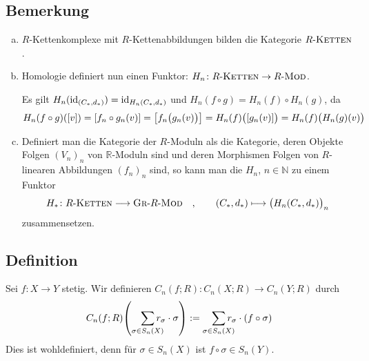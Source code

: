 \subsection[Bemerkung: Homologie definiert einen Funktor]{Bemerkung} %
\label{sub:63}
\begin{enumerate}[a)]
	\item $R$-Kettenkomplexe mit $R$-Kettenabbildungen bilden die Kategorie $R\text{-}\textsc{Ketten}$.
	\item Homologie definiert nun einen Funktor: $H_n \colon R\text{-}\textsc{Ketten} \to R\text{-}\MOD$.
	
	Es gilt $H_n(\id_{(C_*,d_*)}) = \id_{H_n(C_*,d_*)}$ und $H_n(f \circ g) = H_n(f) \circ H_n(g)$, da
	\[
		H_n(f \circ g) \enbrace*{[v]} = \benbrace*{f_n \circ g_n(v)} = \benbrace*{f_n \enbrace[\big]{g_n(v)} } = H_n(f) \enbrace[\big]{\benbrace*{g_n(v)}} = H_n(f) \enbrace[\big]{H_n(g)(v)}     
	\]
	\item Definiert man die Kategorie der  $R$-Moduln als die Kategorie, deren Objekte Folgen $(V_n)_n$ von $\mathds{R}$-Moduln sind und deren
	Morphismen Folgen von $R$-linearen Abbildungen $(f_n)_{n}$ sind, so kann man die $H_n$, $n \in \mathds{N}$ zu einem Funktor
	\[
		H_* \colon R\text{-}\textsc{Ketten} \longrightarrow \textsc{Gr}\text{-}R\text{-}\MOD \quad , \qquad (C_*,d_*) \longmapsto \enbrace[\big]{H_n(C_*,d_*)}_n 
	\]
	zusammensetzen.
\end{enumerate}

\subsection[Definition: Induzierte Abbildung auf Kettenkomplexen]{Definition} %
\label{sub:64}
Sei $f : X \to Y$ stetig. Wir definieren $C_n(f;R) \colon C_n(X;R) \to C_n(Y;R)$ durch
\[
	C_n(f;R) \enbrace*{\smashoperator[r]{\sum_{\sigma \in S_n(X)}} r_\sigma \cdot  \sigma} := \smashoperator[r]{\sum_{\sigma \in S_n(X)}} r_\sigma \cdot \enbrace*{f \circ \sigma} 
\]
Dies ist wohldefiniert, denn für $\sigma \in S_n(X)$ ist $f \circ \sigma \in S_n(Y)$. 

